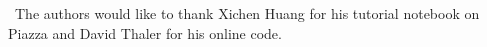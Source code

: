 \documentclass[12pt]{article}
\begin{document}

\quad\ The authors would like to thank Xichen Huang for his tutorial notebook on Piazza and David Thaler for his online code.

\vfill\pagebreak

%
\end{document}
